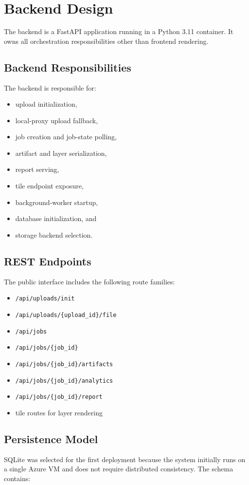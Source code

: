 \documentclass[conference]{IEEEtran}
\begin{document}
\section{Backend Design}
The backend is a FastAPI application running in a Python 3.11 container. It
owns all orchestration responsibilities other than frontend rendering.

\subsection{Backend Responsibilities}
The backend is responsible for:

\begin{itemize}[leftmargin=16pt]
\item upload initialization,
\item local-proxy upload fallback,
\item job creation and job-state polling,
\item artifact and layer serialization,
\item report serving,
\item tile endpoint exposure,
\item background-worker startup,
\item database initialization, and
\item storage backend selection.
\end{itemize}

\subsection{REST Endpoints}
The public interface includes the following route families:

\begin{itemize}[leftmargin=16pt]
\item \texttt{/api/uploads/init}
\item \texttt{/api/uploads/\{upload\_id\}/file}
\item \texttt{/api/jobs}
\item \texttt{/api/jobs/\{job\_id\}}
\item \texttt{/api/jobs/\{job\_id\}/artifacts}
\item \texttt{/api/jobs/\{job\_id\}/analytics}
\item \texttt{/api/jobs/\{job\_id\}/report}
\item tile routes for layer rendering
\end{itemize}

\subsection{Persistence Model}
SQLite was selected for the first deployment because the system initially runs
on a single Azure VM and does not require distributed consistency. The schema
contains:
\end{document}
